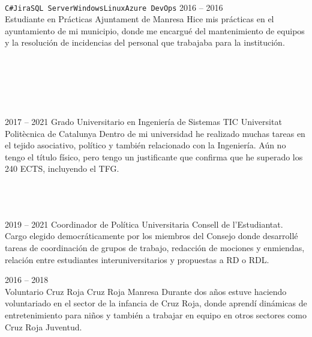 \documentclass[9pt]{developercv} %
\begin{document}
\begin{entrylist}
{		\\ \texttt{C\#}\slashsep\texttt{Jira}\slashsep\texttt{SQL Server}\slashsep\texttt{Windows}\slashsep\texttt{Linux}\slashsep\texttt{Azure DevOps}
		}
	\entry
		{2016 -- 2016\\}
		{Estudiante en Prácticas}
		{Ajuntament de Manresa}
		{ 
			Hice mis prácticas en el ayuntamiento de mi municipio, donde me encargué del mantenimiento de equipos y la resolución de incidencias del personal que trabajaba para la institución. \\ \\ \\ \\ \\ \\ 
			}

\end{entrylist}



\begin{entrylist}
	\entry
		{2017 -- 2021}
		{Grado Universitario en Ingeniería de Sistemas TIC}
		{Universitat Politècnica de Catalunya}
		{Dentro de mi universidad he realizado muchas tareas en el tejido asociativo, político y también relacionado con la Ingeniería. Aún no tengo el título físico, pero tengo un justificante que confirma que he superado los 240 ECTS, incluyendo el TFG.\\ \\ \\ \\}
\end{entrylist}


\begin{entrylist}
	\entry
	{2019 -- 2021}
	{Coordinador de Política Universitaria}
	{Consell de l'Estudiantat.}
	{Cargo elegido democráticamente por los miembros del Consejo donde desarrollé tareas de coordinación de grupos de trabajo, redacción de mociones y enmiendas, relación entre estudiantes interuniversitarios y propuestas a RD o RDL. \\ }

	\entry
	{2016 -- 2018\\}
	{Voluntario Cruz Roja}
	{Cruz Roja Manresa}
	{Durante dos años estuve haciendo voluntariado en el sector de la infancia de Cruz Roja, donde aprendí dinámicas de entretenimiento para niños y también a trabajar en equipo en otros sectores como Cruz Roja Juventud. \\ }
\end{entrylist}
\end{document}
